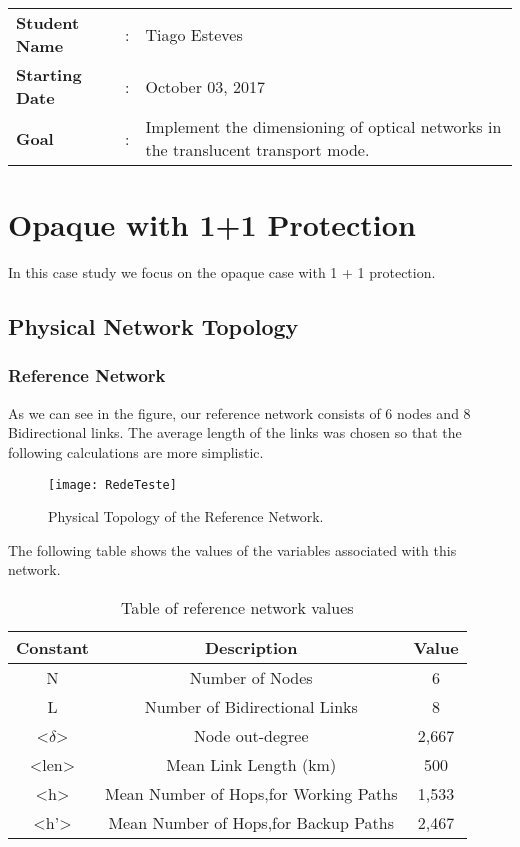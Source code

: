 \clearpage

\begin{tcolorbox}	
\begin{tabular}{p{2.75cm} p{0.2cm} p{10.5cm}} 	
\textbf{Student Name}  &:& Tiago Esteves\\
\textbf{Starting Date} &:& October 03, 2017\\
\textbf{Goal}          &:& Implement the dimensioning of optical networks in the translucent transport mode.
\end{tabular}
\end{tcolorbox}

\section{Opaque with 1+1 Protection}
In this case study we focus on the opaque case with 1 + 1 protection.

\subsection{Physical Network Topology}

\subsubsection{Reference Network}
As we can see in the figure, our reference network consists of 6 nodes and 8 Bidirectional links.
The average length of the links was chosen so that the following calculations are more simplistic.

\begin{figure}[h!]
\centering
\texttt{[image: RedeTeste]}
\caption{Physical Topology of the Reference Network.}
\end{figure}


The following table shows the values of the variables associated with this network.
\begin{table}[h!]
\centering
\begin{tabular}{|| c | c | c||}
 \hline
 Constant & Description & Value \\
 \hline\hline
 N & Number of Nodes & 6 \\
 L & Number of Bidirectional Links & 8 \\
 <$\delta$> & Node out-degree & 2,667 \\
 <len> & Mean Link Length (km) & 500 \\
 <h> & Mean Number of Hops,for Working Paths & 1,533 \\
 <h'> & Mean Number of Hops,for Backup Paths & 2,467 \\
 \hline
\end{tabular}
\caption{Table of reference network values}
\label{table:1}
\end{table}

